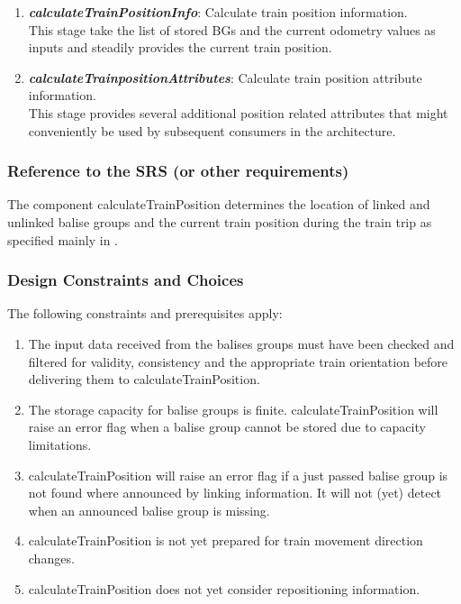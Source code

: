 \begin{enumerate}
\item \textbf{\textit{calculateTrainPositionInfo}}: Calculate train position information.\\
This stage take the list of stored BGs and the current odometry values as inputs and steadily provides the current train position. 

\item \textbf{\textit{calculateTrainpositionAttributes}}: Calculate train position attribute information.\\
This stage provides several additional position related attributes that might conveniently be used by subsequent consumers in the architecture.  
\end{enumerate}

\subsubsection{Reference to the SRS (or other requirements)}
The component calculateTrainPosition determines the location of linked and unlinked balise groups and the current train position during the train trip as specified mainly in \cite[Chapter~3.6]{subset-026}.

\subsubsection{Design Constraints and Choices}
The following constraints and prerequisites apply:
\begin{enumerate}
\item The input data received from the balises groups must have been checked and filtered for validity, consistency and the appropriate train orientation before delivering them to calculateTrainPosition. 
\item The storage capacity for balise groups is finite. calculateTrainPosition will raise an error flag when a balise group cannot be stored due to capacity limitations.
\item calculateTrainPosition will raise an error flag if a just passed balise group is not found where announced by linking information. It will not (yet) detect when an announced balise group is missing. 
\item calculateTrainPosition is not yet prepared for train movement direction changes. 
\item calculateTrainPosition does not yet consider repositioning information.
\end{enumerate}




